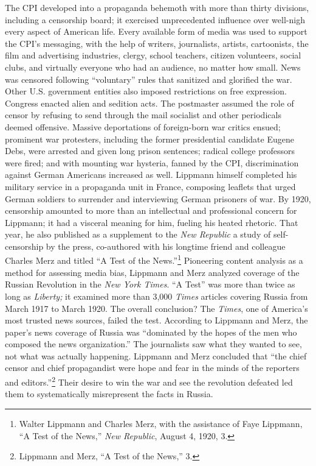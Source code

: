 \documentclass[openany,nobib,nohyper]{tufte-book}
\begin{document}
The CPI developed into a propaganda behemoth with more than thirty
divisions, including a censorship board; it exercised unprecedented
influence over well-nigh every aspect of American life. Every available
form of media was used to support the CPI's messaging, with the help of
writers, journalists, artists, cartoonists, the film and advertising
industries, clergy, school teachers, citizen volunteers, social clubs,
and virtually everyone who had an audience, no matter how small. News
was censored following ``voluntary'' rules that sanitized and glorified
the war. Other U.S. government entities also imposed restrictions on
free expression. Congress enacted alien and sedition acts. The
postmaster assumed the role of censor by refusing to send through the
mail socialist and other periodicals deemed offensive. Massive
deportations of foreign-born war critics ensued; prominent war
protesters, including the former presidential candidate Eugene Debs,
were arrested and given long prison sentences; radical college
professors were fired; and with mounting war hysteria, fanned by the
CPI, discrimination against German Americans increased as well. Lippmann
himself completed his military service in a propaganda unit in France,
composing leaflets that urged German soldiers to surrender and
interviewing German prisoners of war.
\clearpage
By 1920, censorship amounted to more than an intellectual and
professional concern for Lippmann; it had a visceral meaning for him,
fueling his heated rhetoric. That year, he also published as a
supplement to the \emph{New Republic} a study of self-censorship by the
press, co-authored with his longtime friend and colleague Charles
Merz and titled ``A Test of the
News.''\footnote{Walter Lippmann and Charles Merz, with the assistance of Faye
  Lippmann, ``A Test of the News,'' \emph{New Republic}, August 4, 1920,
  3.} Pioneering content analysis
as a method for assessing media bias, Lippmann and Merz analyzed
coverage of the Russian Revolution in the \emph{New York Times}. ``A
Test'' was more than twice as long as \emph{Liberty;} it examined more
than 3,000 \emph{Times} articles covering Russia from March 1917 to
March 1920. The overall conclusion? The \emph{Times}, one of America's
most trusted news sources, failed the test. According to Lippmann and
Merz, the paper's news coverage of Russia was ``dominated by the hopes
of the men who composed the news organization.'' The journalists saw
what they wanted to see, not what was actually happening. Lippmann and
Merz concluded that ``the chief censor and chief propagandist were hope
and fear in the minds of the reporters and
editors.''\footnote{Lippmann and Merz, ``A Test of the News,'' 3.} Their desire to win the
war and see the revolution defeated led them to systematically
misrepresent the facts in Russia.
\end{document}
